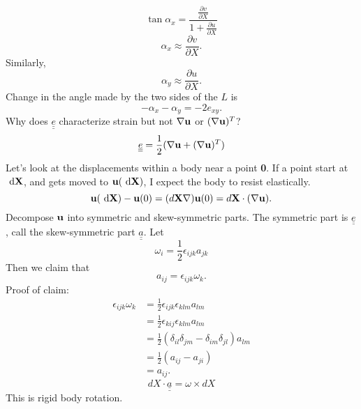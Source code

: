 \documentclass[12pt]{article}
\newcommand{\uu}{{\bf u}}
\newcommand{\bX}{{\bf X}}
\newcommand{\bnabla}{{\bf \nabla}}
\newcommand{\te}{{\underline{\underline e}}}
\newcommand{\ta}{{\underline{\underline a}}}
\newcommand{\dx}[1]{\text{ d}#1}
\begin{document}
\[
\tan \alpha_x = \frac{ \frac{\partial v}{\partial X}}{1 +  \frac{\partial u}{\partial X}}
\]
\[
\alpha_x\approx  \frac{\partial v}{\partial X}.
\]
Similarly,
\[
\alpha_y\approx  \frac{\partial u}{\partial X}.
\]
Change in the angle made by the two sides of the $L$ is 
\[
-\alpha_x -\alpha_y = -2e_{xy}.
\]
Why does $\underline{\underline e}$ characterize strain but not $\bnabla\uu$ or $(\bnabla\uu)^T$?\[
\underline{\underline e} = \frac 1 2 (\bnabla\uu + (\bnabla\uu)^T)
\]
Let's look at the displacements within a body near a point {\bf 0}. If a point start at $\dx{\bX}$, and gets moved to $\uu(\dx{\bX} )$, I expect the body to resist elastically.
\[
\uu(\dx{\bX}) - \uu(0) = (d\bX \bnabla) \uu(0) = d\bX\cdot(\bnabla \uu).
\] 
Decompose $\uu$ into symmetric and skew-symmetric parts. The symmetric part is $\te$, call the skew-symmetric part $\ta$. Let
\[
\omega_i = \frac 1 2 \epsilon_{ijk}a_{jk}
\]
Then we claim that 
\[
a_{ij} = \epsilon_{ijk}\omega_k.
\]
Proof of claim:
\begin{align*}
\epsilon_{ijk}\omega_k &= \frac 1 2  \epsilon_{ijk}  \epsilon_{klm} a_{lm} \\
&=  \frac 1 2  \epsilon_{kij}  \epsilon_{klm} a_{lm}\\
&=\frac 1 2 (\delta_{il}\delta_{jm} - \delta_{im}\delta_{jl})a_{lm}\\
&= \frac 1 2 (a_{ij} - a_{ji}) \\
&= a_{ij}.
\end{align*}
\[
dX\cdot \ta = \omega\times dX
\]
This is rigid body rotation.
\end{document}
